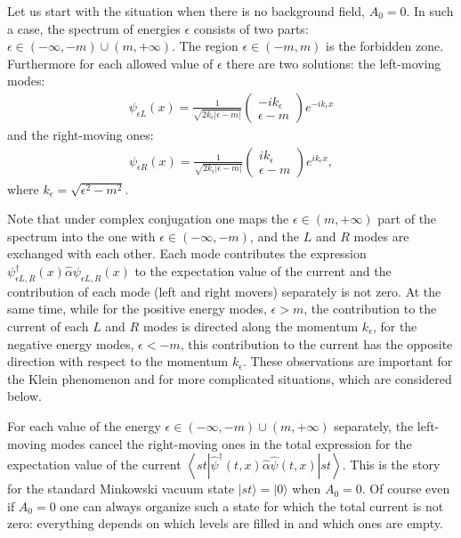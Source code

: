 \documentclass[12pt]{article}
\begin{document}
Let us start with the situation when there is no background field, $A_0 = 0$. In such a case, the spectrum of energies $\epsilon$ consists of two parts: $\epsilon\in(-\infty,-m)\cup (m,+\infty)$. The region $\epsilon \in (-m,m)$ is the forbidden zone. Furthermore for each allowed value of $\epsilon$ there are two solutions: the left-moving modes:
\begin{gather}
\label{leftfree}
    \psi_{\epsilon L}(x) = \frac{1}{\sqrt{2k_\epsilon\left|\epsilon-m\right|}}
    \begin{pmatrix}
        -ik_\epsilon \\
        \epsilon - m
    \end{pmatrix}e^{-ik_\epsilon x} 
\end{gather}
and the right-moving ones:
\begin{gather}
\label{rightfree}
    \psi_{\epsilon R}(x) = \frac{1}{\sqrt{2k_\epsilon\left|\epsilon-m\right|}}
    \begin{pmatrix}
        ik_\epsilon \\
        \epsilon - m
    \end{pmatrix}e^{ik_\epsilon x} ,
\end{gather}
where $k_\epsilon = \sqrt{\epsilon^2-m^2}$.  

Note that under complex conjugation one maps the $\epsilon\in (m,+\infty)$ part of the spectrum into the one with $\epsilon\in(-\infty,-m)$, and the $L$ and $R$ modes are exchanged with each other. Each mode contributes the expression $\psi_{\epsilon L,R}^{\dagger}(x)\hat{\alpha}\psi_{\epsilon L,R}(x)$ to the expectation value of the current and the contribution of each mode (left and right movers) separately is not zero. At the same time, while for the positive energy modes, $\epsilon > m$, the contribution to the current of each $L$ and $R$ modes is directed along the momentum $k_\epsilon$, for the negative energy modes, $\epsilon < - m$, this contribution to the current has the opposite direction with respect to the momentum $k_\epsilon$. These observations are important for the Klein phenomenon and for more complicated situations, which are considered below.
 
For each value of the energy $\epsilon \in (-\infty,-m)\cup (m,+\infty)$ separately, the left-moving modes cancel the right-moving ones in the total expression for the expectation value of the current $\left\langle st\left|\hat{\psi}^{\dagger}(t,x)\hat{\alpha}\hat{\psi}(t,x)\right|st\right\rangle$. This is the story for the standard Minkowski vacuum state $|st\rangle = |0\rangle$ when $A_0 = 0$. Of course even if $A_0 = 0$ one can always organize such a state for which the total current is not zero: everything depends on which levels are filled in and which ones are empty. 
\end{document}
